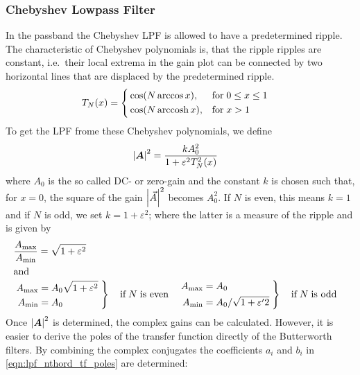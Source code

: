 \subsubsection{Chebyshev Lowpass Filter}
In the passband the Chebyshev \ac{LPF} is allowed to have a predetermined ripple. The characteristic of Chebyshev polynomials is, that the ripple ripples are constant, i.e.\ their local extrema in the gain plot can be connected by two horizontal lines that are displaced by the predetermined ripple.
\begin{align}
  T_N(x) &=\left\{%
    \begin{aligned}
      &\cos(N \arccos x),  &\text{for}\;&0\leq x\leq 1\\
      &\cos(N \arccosh x), &\text{for}\;&x>1
    \end{aligned}
  \right.
\end{align}
To get the \ac{LPF} frome these Chebyshev polynomials, we define
\begin{align}
  \abs{\bm{A}}^2 &= \frac{kA_0^2}{1+\varepsilon^2T_N^2(x)}
\end{align}
where $A_0$ is the so called DC- or zero-gain and the constant $k$ is chosen such that, for $x=0$, the square of the gain $\abs{\vec{A}}^2$ becomes $A_0^2$. If $N$ is even, this means $k=1$ and if $N$ is odd, we set $k=1+\varepsilon^2$; where the latter is a measure of the ripple and is given by
\begin{align}
  &\frac{A_{\max}}{A_{\min}} = \sqrt{1+\varepsilon^2}\\
  \intertext{and}
  &\left.\begin{aligned}
    A_{\max} &= A_0\sqrt{1+\varepsilon^2}\;\\
    A_{\min} &= A_0
  \end{aligned}\right\}
  \quad\text{if}\;N\;\text{is even}
  &&\left.\begin{aligned}
    A_{\max} &= A_0\\
    A_{\min} &= A_0/\sqrt{1+\varepsilon'2}\;
  \end{aligned}\right\}
  \quad\text{if}\;N\;\text{is odd}
\end{align}
Once $\abs{\bm{A}}^2$ is determined, the complex gains can be calculated. However, it is easier to derive the poles of the transfer function directly of the Butterworth filters. By combining the complex conjugates the coefficients $a_i$ and $b_i$ in \eqref{eqn:lpf_nthord_tf_poles} are determined:
